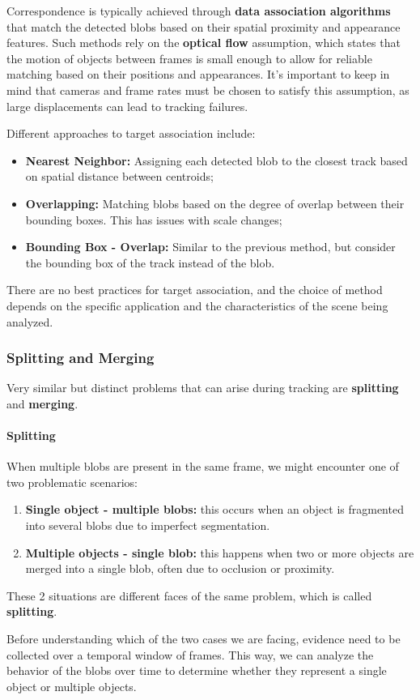 Correspondence is typically achieved through \textbf{data association algorithms} that match the detected blobs based on their spatial proximity and appearance features.
Such methods rely on the \textbf{optical flow} assumption, which states that the motion of objects between frames is small enough to allow for reliable matching based on their positions and appearances. 
It's important to keep in mind that cameras and frame rates must be chosen to satisfy this assumption, as large displacements can lead to tracking failures.

Different approaches to target association include:
\begin{itemize}
    \item \textbf{Nearest Neighbor:} Assigning each detected blob to the closest track based on spatial distance between centroids;
    \item \textbf{Overlapping:} Matching blobs based on the degree of overlap between their bounding boxes. 
    This has issues with scale changes;
    \item \textbf{Bounding Box - Overlap:} Similar to the previous method, but consider the bounding box of the track instead of the blob.
\end{itemize}
There are no best practices for target association, and the choice of method depends on the specific application and the characteristics of the scene being analyzed.

\subsubsection{Splitting and Merging}
Very similar but distinct problems that can arise during tracking are \textbf{splitting} and \textbf{merging}.

\paragraph{Splitting}
When multiple blobs are present in the same frame, we might encounter one of two problematic scenarios:
\begin{enumerate}
    \item \textbf{Single object - multiple blobs:} this occurs when an object is fragmented into several blobs due to imperfect segmentation.
    \item \textbf{Multiple objects - single blob:} this happens when two or more objects are merged into a single blob, often due to occlusion or proximity.
\end{enumerate}
These 2 situations are different faces of the same problem, which is called \textbf{splitting}. 

Before understanding which of the two cases we are facing, evidence need to be collected over a temporal window of frames.
This way, we can analyze the behavior of the blobs over time to determine whether they represent a single object or multiple objects.

